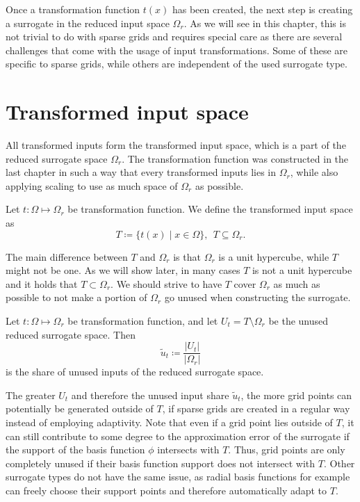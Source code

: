 \documentclass[
  a4paper,  %
  twoside,  %
  bibliography=totoc,
  headsepline,
  cleardoublepage=empty,
  parskip=half,
  draft=false
]{scrbook}
\begin{document}
Once a transformation function $t(x)$ has been created, the next step is creating a surrogate in the reduced input space $\Omega_r$.
As we will see in this chapter, this is not trivial to do with sparse grids and requires special care as there are several challenges that come with the usage of input transformations.
Some of these are specific to sparse grids, while others are independent of the used surrogate type.

\section{Transformed input space}
\label{sec:tis}

All transformed inputs form the transformed input space, which is a part of the reduced surrogate space $\Omega_r$.
The transformation function was constructed in the last chapter in such a way that every transformed inputs lies in $\Omega_r$, while also applying scaling to use as much space of $\Omega_r$ as possible.
\begin{definition}
Let $t \colon \Omega \mapsto \Omega_r$ be transformation function.
We define the transformed input space as
\begin{equation}
T \coloneqq \{t(x) \mid x \in\Omega\}, ~~ T \subseteq \Omega_r.
\end{equation}
\end{definition}
The main difference between $T$ and $\Omega_r$ is that $\Omega_r$ is a unit hypercube, while $T$ might not be one.
As we will show later, in many cases $T$ is not a unit hypercube and it holds that $T \subset \Omega_r$.
We should strive to have $T$ cover $\Omega_r$ as much as possible to not make a portion of $\Omega_r$ go unused when constructing the surrogate.
\begin{definition}
Let $t \colon \Omega \mapsto \Omega_r$ be transformation function, and let $U_t=T \setminus \Omega_r$ be the unused reduced surrogate space.
Then
\begin{equation}
\tilde{u}_t \coloneqq \frac{|U_t|}{|\Omega_r|}
\end{equation}
is the share of unused inputs of the reduced surrogate space.
\end{definition}

The greater $U_t$ and therefore the unused input share $\tilde{u}_t$, the more grid points can potentially be generated outside of $T$, if sparse grids are created in a regular way instead of employing adaptivity.
Note that even if a grid point lies outside of $T$, it can still contribute to some degree to the approximation error of the surrogate if the support of the basis function $\phi$ intersects with $T$.
Thus, grid points are only completely unused if their basis function support does not intersect with $T$.
Other surrogate types do not have the same issue, as radial basis functions for example can freely choose their support points and therefore automatically adapt to $T$.
\end{document}
